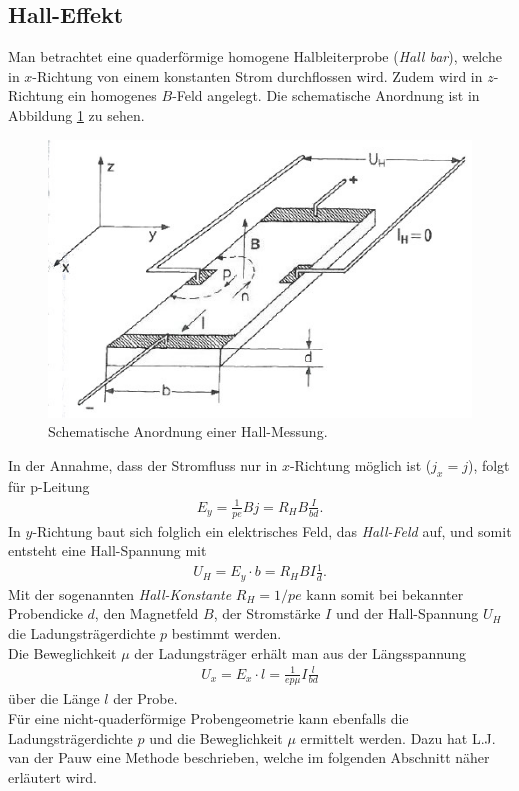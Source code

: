 \documentclass[a4paper,12pt]{article}
\begin{document}
\subsection{Hall-Effekt}
Man betrachtet eine quaderförmige homogene Halbleiterprobe (\emph{Hall bar}), welche in $x$-Richtung von einem konstanten Strom durchflossen wird. Zudem wird in $z$-Richtung ein homogenes $B$-Feld angelegt. Die schematische Anordnung ist in Abbildung \ref{fig:hall-effect} zu sehen.
\begin{figure}[h]
\centering
\includegraphics[scale=1]{Hall_effect.jpeg}
\caption{Schematische Anordnung einer Hall-Messung. \cite{lit:Iba09}}
\label{fig:hall-effect}
\end{figure}
In der Annahme, dass der Stromfluss nur in $x$-Richtung möglich ist ($j_x=j$), folgt für p-Leitung
\begin{align}
E_y=\frac{1}{pe}Bj=R_H B\frac{I}{bd}.
\end{align}
In $y$-Richtung baut sich folglich ein elektrisches Feld, das \emph{Hall-Feld} auf, und somit entsteht eine Hall-Spannung mit
\begin{align}
U_H=E_y\cdot b=R_H B I\frac{1}{d}.
\end{align}
Mit der sogenannten \emph{Hall-Konstante} $R_H=1/pe$ kann somit bei bekannter Probendicke $d$, den Magnetfeld $B$, der Stromstärke $I$ und der Hall-Spannung $U_H$ die Ladungsträgerdichte $p$ bestimmt werden.\\
Die Beweglichkeit $\mu$ der Ladungsträger erhält man aus der Längsspannung
\begin{align}
U_x=E_x\cdot l=\frac{1}{ep\mu}I\frac{l}{bd}
\end{align}
über die Länge $l$ der Probe.\\
Für eine nicht-quaderförmige Probengeometrie kann ebenfalls die Ladungsträgerdichte $p$ und die Beweglichkeit $\mu$ ermittelt werden. Dazu hat L.J. van der Pauw eine Methode beschrieben, welche im folgenden Abschnitt näher erläutert wird.
\end{document}
